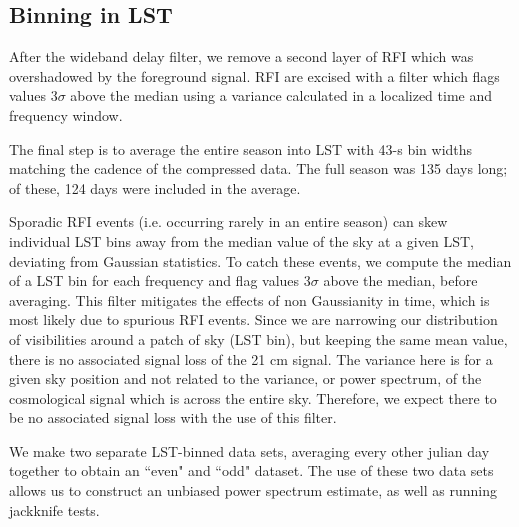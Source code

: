 \documentclass[twocolumn,numberedappendix]{emulateapj} \shorttitle{PSA64}
\begin{document}
\subsection{Binning in LST}\label{sec:lstbin}

After the wideband delay filter, we remove a second layer of RFI 
 which was overshadowed by the foreground signal. RFI are excised with a filter
which flags values $3\sigma$ above the median using a variance calculated in a
localized time and frequency window.  


The final step is to average the entire season into LST
with 43-s bin widths matching the cadence of
the compressed data. The full season was 135 days long; of these, 124
days were included in the average. 

Sporadic RFI events (i.e. occurring rarely in an entire season) can skew
individual LST bins away from the median value of the sky at a given LST,
deviating from Gaussian statistics. To catch these events, we compute the median
of a LST bin for each frequency and flag values 3$\sigma$ above the median,
before averaging. This filter mitigates the effects of non Gaussianity in time,
which is most likely due to spurious RFI events. Since we are narrowing our
distribution of visibilities around a patch of sky (LST bin), but keeping the
same mean value, there is no associated signal loss of the 21 cm signal. The
variance here is for a given sky position and not related to the variance, or
power spectrum, of the cosmological signal which is across the entire sky.
Therefore, we expect there to be no associated signal loss with the use of this
filter.

We make two separate LST-binned data sets, averaging every other julian day
together to obtain an ``even" and ``odd" dataset. The use of these two data sets
allows us to construct an unbiased power spectrum estimate, as well as running
jackknife tests. 
\end{document}
